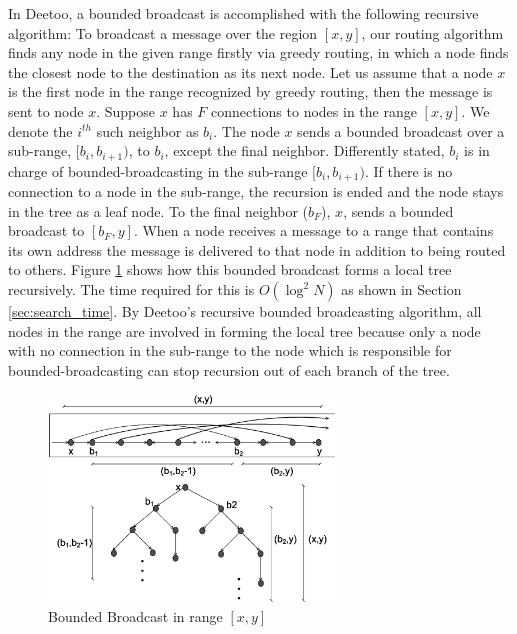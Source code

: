 \documentclass[conference]{IEEEtran}
\begin{document}
In Deetoo, a bounded broadcast is accomplished with the following 
recursive algorithm:  
To broadcast a message over the region $[x, y]$, 
our routing algorithm finds any node in the given range firstly via greedy routing,
in which a node finds the closest node to the destination as its next node.
Let us assume that a node $x$ is the first node in the range recognized by greedy routing, 
then the message is sent to node $x$. 
Suppose $x$ has $F$ connections to nodes in the range $[x, y]$. 
We denote the $i^{th}$ such neighbor as $b_i$.
The node $x$ sends a bounded broadcast over a sub-range, 
$[b_i, b_{i+1})$, to $b_i$, except the final neighbor. 
Differently stated, $b_i$ is in charge of bounded-broadcasting 
in the sub-range $[b_i, b_{i+1})$. If there is no connection to a node in the sub-range, 
the recursion is ended and the node stays in the tree as a leaf node.
To the final
neighbor ($b_F$), $x$, sends a bounded broadcast to $[b_F, y]$.
When a node receives a message to a range that contains its own address
the message is delivered to that node in addition to being routed to others.
Figure \ref{fig:tree} shows how this bounded broadcast forms a local 
tree recursively. The time required for this is $O(\log^2 N)$ as 
shown in Section \ref{sec:search_time}.
By Deetoo's recursive bounded broadcasting algorithm, all nodes in the range 
are involved in forming the local tree because only a node with no connection 
in the sub-range to the node which is responsible for bounded-broadcasting 
can stop recursion out of each branch of the tree.

\begin{figure}
\centering
\includegraphics[width=3.0in]{tree}
\caption{Bounded Broadcast in range $[x, y]$} \label{fig:tree}
\end{figure}
\end{document}
